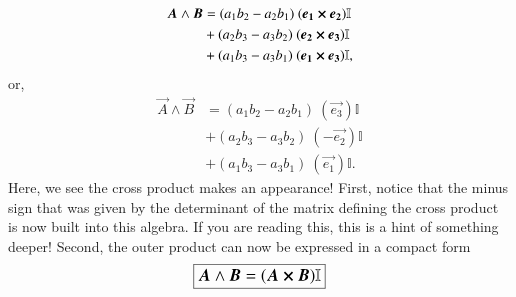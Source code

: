 \begin{align*}
    \boldsymbol{A}  \wedge \boldsymbol{B}   &= (a_1 b_2 - a_2 b_1) \  (\boldsymbol{e_1} \cross \boldsymbol{e_2}) \mathbb{I} \\
                &+ (a_2 b_3 - a_3 b_2) \  (\boldsymbol{e_2} \cross \boldsymbol{e_3}) \mathbb{I} \\
                &+ (a_1 b_3 - a_3 b_1 ) \ (\boldsymbol{e_1} \cross \boldsymbol{e_3}) \mathbb{I},
\end{align*}
or, 
\begin{align*}
    \vec{A}  \wedge \vec{B}   &= (a_1 b_2 - a_2 b_1) \  (\vec{e_3}) \mathbb{I} \\
                &+ (a_2 b_3 - a_3 b_2) \  (-\vec{e_2}) \mathbb{I} \\
                &+ (a_1 b_3 - a_3 b_1 ) \ (\vec{e_1}) \mathbb{I}.
\end{align*}
Here, we see the cross product makes an appearance! First, notice that the minus sign that was given by the determinant of the matrix defining the cross product is now built into this algebra. If you are reading this, this is a hint of something deeper! Second, the outer product can now be expressed in a compact form
\begin{equation}
    \label{eq:cross_product_outer_product}
    \large\boxed{\boldsymbol{A}  \wedge \boldsymbol{B}  = (\boldsymbol{A}  \cross \boldsymbol{B} ) \mathbb{I}}
\end{equation}


